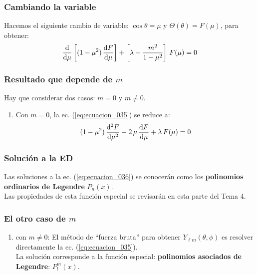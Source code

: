 \documentclass[12pt]{beamer}
\begin{document}
\begin{frame}
\frametitle{Cambiando la variable}
Hacemos el siguiente cambio de variable: $\cos \theta = \mu$ y $\Theta(\theta) = F(\mu)$, para obtener:
\pause
\begin{align}
\dv{\mu} \left[ (1 - \mu^{2}) \, \dv{F}{\mu} \right] + \left[ \lambda - \dfrac{m^{2}}{1 - \mu^{2}} \right] \, F(\mu) = 0
\label{eq:ecuacion_035}
\end{align}
\end{frame}
\begin{frame}
\frametitle{Resultado que depende de $m$}
Hay que considerar dos casos: $m = 0$ y $m \neq 0$.
\pause
{}
\begin{enumerate}[<+->]
\item Con $m = 0$, la ec. (\ref{eq:ecuacion_035}) se reduce a:
\pause
\begin{align}
(1 - \mu^{2}) \, \dv[2]{F}{\mu} - 2  \, \mu \, \dv{F}{\mu} + \lambda \, F(\mu) = 0
\label{eq:ecuacion_036}
\end{align}
\seti
\end{enumerate}
\end{frame}
\begin{frame}
\frametitle{Solución a la ED}
Las soluciones a la ec. (\ref{eq:ecuacion_036}) se conocerán como los \textbf{\textcolor{blue(munsell)}{polinomios ordinarios de Legendre}} $P_{n} (x)$.
\\
\bigskip
\pause
Las propiedades de esta función especial se revisarán en esta parte del Tema 4.
\end{frame}
\begin{frame}
\frametitle{El otro caso de $m$}
\begin{enumerate}[<+->]
\conti
\item con $m \neq 0$: \pause El método de \enquote{fuerza bruta} para obtener $Y_{\ell m} (\theta, \phi)$ es resolver directamente la ec. (\ref{eq:ecuacion_035}).
\\
\bigskip
\pause
La solución corresponde a la función especial: \textbf{\textcolor{carmine}{polinomios asociados de Legendre}}: $P_{l}^{m} (x)$.
\end{enumerate}
\end{frame}
\end{document}

